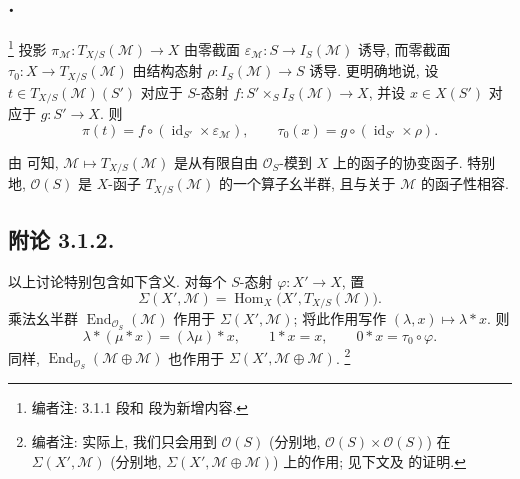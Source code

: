 \subsection*{.}
\footnote{编者注: 3.1.1 段和  段为新增内容.}
投影
\(\pi_{\mathcal M}:T_{X/S}(\mathcal M)\to X\) 由零截面
\(\varepsilon_{\mathcal M}:S\to I_S(\mathcal M)\) 诱导,
而零截面 \(\tau_0:X\to T_{X/S}(\mathcal M)\) 由结构态射
\(\rho:I_S(\mathcal M)\to S\) 诱导. 更明确地说, 设
\(t\in T_{X/S}(\mathcal M)(S')\) 对应于 \(S\)-态射
\(f:S'\times_S I_S(\mathcal M)\to X\), 并设 \(x\in X(S')\)
对应于 \(g:S'\to X\). 则
\[
  \pi(t)=f\circ(\operatorname{id}_{S'}\times\varepsilon_{\mathcal M}),
  \qquad
  \tau_0(x)=g\circ(\operatorname{id}_{S'}\times\rho).
\]

由  可知,
\(\mathcal M\mapsto T_{X/S}(\mathcal M)\) 是从有限自由
\(\mathcal O_S\)-模到 \(X\) 上的函子的协变函子.
特别地, \(\mathcal O(S)\) 是 \(X\)-函子
\(T_{X/S}(\mathcal M)\) 的一个算子幺半群,
且与关于 \(\mathcal M\) 的函子性相容.

\subsection*{附论 3.1.2.}
\footnotemark[15]
以上讨论特别包含如下含义. 对每个 \(S\)-态射
\(\varphi:X'\to X\), 置
\[
  \Sigma(X',\mathcal M)
  =\operatorname{Hom}_X\bigl(X',T_{X/S}(\mathcal M)\bigr).
\]
乘法幺半群
\(\operatorname{End}_{\mathcal O_S}(\mathcal M)\) 作用于
\(\Sigma(X',\mathcal M)\); 将此作用写作
\((\lambda,x)\mapsto\lambda*x\). 则
\[
  \lambda*(\mu*x)=(\lambda\mu)*x,\qquad
  1*x=x,\qquad 0*x=\tau_0\circ\varphi.
\]
同样, \(\operatorname{End}_{\mathcal O_S}(\mathcal M\oplus\mathcal M)\)
也作用于 \(\Sigma(X',\mathcal M\oplus\mathcal M)\).
\footnote{编者注: 实际上, 我们只会用到 \(\mathcal O(S)\)
(分别地, \(\mathcal O(S)\times\mathcal O(S)\)) 在
\(\Sigma(X',\mathcal M)\) (分别地,
\(\Sigma(X',\mathcal M\oplus\mathcal M)\)) 上的作用;
见下文及  的证明.}

